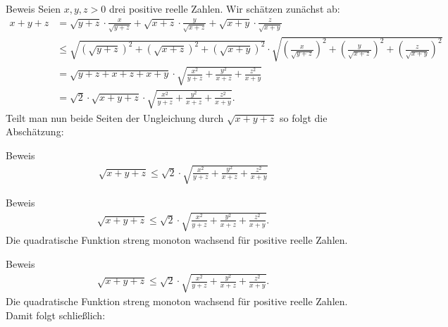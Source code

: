 \documentclass[10pt]{beamer}
\begin{document}
\begin{frame}{Beweis}
    Seien \( x, y, z > 0 \) drei positive reelle Zahlen. Wir schätzen zunächst ab:
    {\footnotesize
    \begin{align*}
        x + y + z
        & = \sqrt{y + z} \cdot \frac{x}{\sqrt{y + z}} + \sqrt{x + z} \cdot \frac{y}{\sqrt{x + z}} + \sqrt{x + y} \cdot \frac{z}{\sqrt{x + y}} \\
        & \leq \sqrt{\left( \sqrt{y + z} \right)^{2} + \left( \sqrt{x + z} \right)^{2} + \left( \sqrt{x + y} \right)^{2}} \cdot \sqrt{\left( \frac{x}{\sqrt{y + z}}\right)^{2} + \left( \frac{y}{\sqrt{x + z}}\right)^{2} + \left( \frac{z}{\sqrt{x + y}}\right)^{2}} \\
        & = \sqrt{y + z + x + z + x + y} \cdot \sqrt{\frac{x^{2}}{y + z} + \frac{y^{2}}{x + z} + \frac{z^{2}}{x + y}} \\
        & = \sqrt{2} \cdot \sqrt{x + y + z} \cdot \sqrt{\frac{x^{2}}{y + z} + \frac{y^{2}}{x + z} + \frac{z^{2}}{x + y}}.
    \end{align*}
    }
    Teilt man nun beide Seiten der Ungleichung durch \( \sqrt{x + y + z} \) so folgt die Abschätzung:
\end{frame}



\begin{frame}{Beweis}
    \begin{align*}
        \sqrt{x + y + z}
        \leq \sqrt{2} \cdot \sqrt{\frac{x^{2}}{y + z} + \frac{y^{2}}{x + z} + \frac{z^{2}}{x + y}}
    \end{align*}
\end{frame}



\begin{frame}{Beweis}
    \begin{align*}
        \sqrt{x + y + z}
        \leq \sqrt{2} \cdot \sqrt{\frac{x^{2}}{y + z} + \frac{y^{2}}{x + z} + \frac{z^{2}}{x + y}}.
    \end{align*}
    Die quadratische Funktion streng monoton wachsend für positive reelle Zahlen.
\end{frame}



\begin{frame}{Beweis}
    \begin{align*}
        \sqrt{x + y + z}
        \leq \sqrt{2} \cdot \sqrt{\frac{x^{2}}{y + z} + \frac{y^{2}}{x + z} + \frac{z^{2}}{x + y}}.
    \end{align*}
    Die quadratische Funktion streng monoton wachsend für positive reelle Zahlen. Damit folgt schließlich:
\end{frame}
\end{document}
